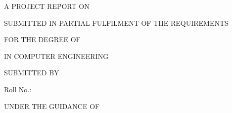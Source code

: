 \begin{titlepage}
\centering
\thispagestyle{empty}


{\large A PROJECT REPORT ON\par}
\vspace{0.8cm}

{\LARGE\bfseries \projecttitle\par}
\vspace{0.4cm}
{\large \projectsubtitle\par}

\vfill

{\large SUBMITTED IN PARTIAL FULFILMENT OF THE REQUIREMENTS\par}
{\large FOR THE DEGREE OF\par}
\vspace{0.3cm}
{\large\bfseries \degreename\par}
{\large IN COMPUTER ENGINEERING\par}

\vfill

{\large SUBMITTED BY\par}
\vspace{0.3cm}
{\large\bfseries \studentname\par}
{\large Roll No.: \studentroll\par}

\vfill

{\large UNDER THE GUIDANCE OF\par}
\vspace{0.3cm}
{\large\bfseries \guidename\par}
{\large \guidedesignation\par}

\vfill


{\large\bfseries \departmentname\par}
{\large \collegename\par}
{\large \universityname\par}
\vspace{0.5cm}
{\large \academicyear\par}

\end{titlepage}

